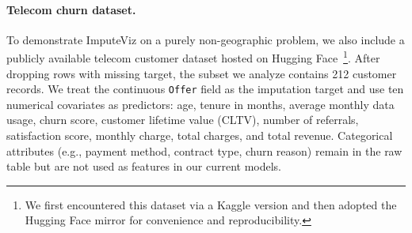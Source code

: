 \documentclass{egpubl}
\newcommand{\gknn}{gKNN\xspace}
\newcommand{\mice}{MICE\xspace}
\newcommand{\tool}{ImputeViz\xspace}
\begin{document}


\paragraph*{Telecom churn dataset.}
To demonstrate \tool on a purely non-geographic problem, we also include a publicly available telecom customer dataset hosted on Hugging Face~\cite{telcoHF}\footnote{We first encountered this dataset via a Kaggle version and then adopted the Hugging Face mirror for convenience and reproducibility.}. After dropping rows with missing target, the subset we analyze contains 212 customer records. We treat the continuous \texttt{Offer} field as the imputation target and use ten numerical covariates as predictors: age, tenure in months, average monthly data usage, churn score, customer lifetime value (CLTV), number of referrals, satisfaction score, monthly charge, total charges, and total revenue. Categorical attributes (e.g., payment method, contract type, churn reason) remain in the raw table but are not used as features in our current models.
\end{document}
